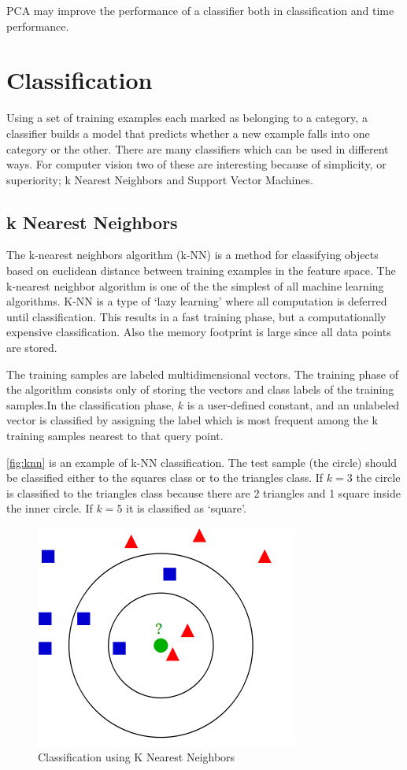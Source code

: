 PCA may improve the performance of a classifier both in classification and time performance.

\section{Classification}
Using a set of training examples each marked as belonging to a category, a classifier builds a model that predicts whether a new example falls into one category or the other. There are many classifiers which can be used in different ways. For computer vision two of these are interesting because of simplicity, or superiority; k Nearest Neighbors and Support Vector Machines.

\subsection*{k Nearest Neighbors}
The k-nearest neighbors algorithm (k-NN) is a method for classifying objects based on euclidean distance between training examples in the feature space. The k-nearest neighbor algorithm is one of the the simplest of all machine learning  algorithms. K-NN is a type of `lazy learning' where all computation is deferred until classification. This results in a fast training phase, but a computationally expensive classification. Also the memory footprint is large since all data points are stored. 

The training samples are labeled multidimensional vectors. The training phase of the algorithm consists only of storing the vectors and class labels of the training samples.In the classification phase, $k$ is a user-defined constant, and an unlabeled vector is classified by assigning the label which is most frequent among the k training samples nearest to that query point.

\autoref{fig:knn} is an example of k-NN classification. The test sample (the circle) should be classified either to the squares class or to the triangles class. If $k = 3$ the circle is classified to the triangles class because there are 2 triangles and 1 square inside the inner circle. If $k = 5$ it is classified as `square'.

\begin{figure}[tb]
\center{}
\includegraphics[width=0.5\linewidth]{figures/knn.png}
\caption{Classification using K Nearest Neighbors}
\label{fig:knn}
\end{figure}




